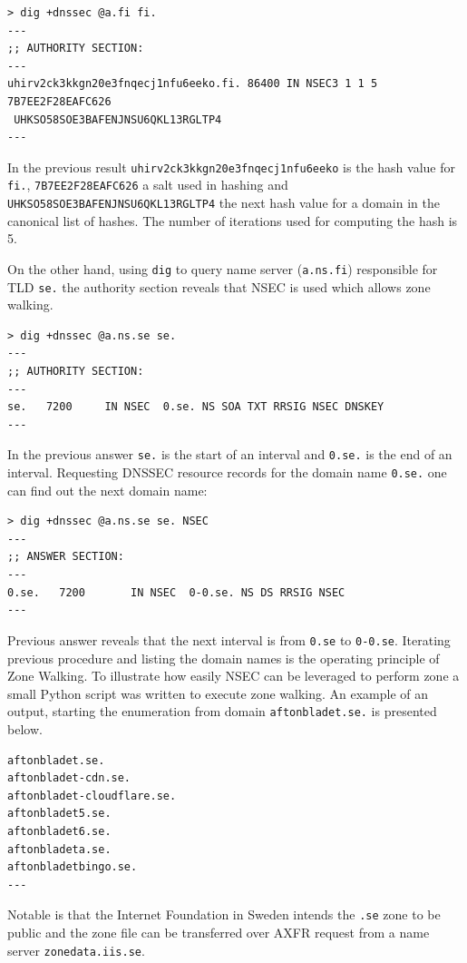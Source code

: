 \begin{verbatim}
> dig +dnssec @a.fi fi.
---
;; AUTHORITY SECTION:
---
uhirv2ck3kkgn20e3fnqecj1nfu6eeko.fi. 86400 IN NSEC3 1 1 5 7B7EE2F28EAFC626
 UHKSO58SOE3BAFENJNSU6QKL13RGLTP4
---
\end{verbatim}

In the previous result \texttt{uhirv2ck3kkgn20e3fnqecj1nfu6eeko} is the hash value for \texttt{fi.}, \texttt{7B7EE2F28EAFC626} a salt used in hashing and \texttt{UHKSO58SOE3BAFENJNSU6QKL13RGLTP4} the next hash value for a domain in the canonical list of hashes. The number of iterations used for computing the hash is 5. 

On the other hand, using \texttt{dig} to query name server (\texttt{a.ns.fi}) responsible for TLD \texttt{se.} the authority section reveals that NSEC is used which allows zone walking.

\begin{verbatim}
> dig +dnssec @a.ns.se se.
---
;; AUTHORITY SECTION:
---
se.   7200	   IN NSEC 	0.se. NS SOA TXT RRSIG NSEC DNSKEY
---
\end{verbatim}

In the previous answer \texttt{se.} is the start of an interval and \texttt{0.se.} is the end of an interval. Requesting DNSSEC resource records for the domain name \texttt{0.se.} one can find out the next domain name:

\begin{verbatim}
> dig +dnssec @a.ns.se se. NSEC
---
;; ANSWER SECTION:
---
0.se.   7200	   IN NSEC 	0-0.se. NS DS RRSIG NSEC
---
\end{verbatim}

Previous answer reveals that the next interval is from \texttt{0.se} to \texttt{0-0.se}. Iterating previous procedure and listing the domain names is the operating principle of Zone Walking. To illustrate how easily NSEC can be leveraged to perform zone a small Python script was written to execute zone walking. An example of an output, starting the enumeration from domain \texttt{aftonbladet.se.} is presented below.

\begin{verbatim}
aftonbladet.se.
aftonbladet-cdn.se.
aftonbladet-cloudflare.se.
aftonbladet5.se.
aftonbladet6.se.
aftonbladeta.se.
aftonbladetbingo.se.
---
\end{verbatim}

Notable is that the Internet Foundation in Sweden \cite{sweden} intends the \texttt{.se} zone to be public and the zone file can be transferred over AXFR request from a name server \texttt{zonedata.iis.se}.


